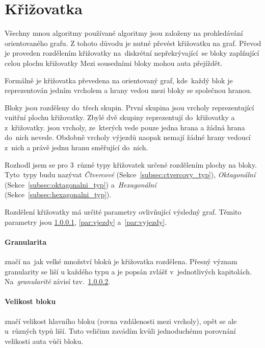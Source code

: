 \section{Křižovatka}\label{sec:krizovatka}

%


Všechny mnou algoritmy používané algoritmy jsou založeny na prohledávání orientovaného grafu.
Z tohoto důvodu je nutné převést křižovatku na graf.
Převod je proveden rozdělením křižovatky na~diskrétní nepřekrývající~se bloky zaplňující celou plochu křižovatky
Mezi sousedními bloky mohou auta přejíždět.

Formálně je křižovatka převedena na orientovaný graf,
kde~každý blok je reprezentován jedním vrcholem a hrany vedou mezi bloky se společnou hranou.

Bloky jsou rozděleny do~třech skupin.
První skupina jsou vrcholy reprezentující vnitřní plochu křižovatky.
Zbylé dvě skupiny reprezentují  do~křižovatky a  z~křižovatky.
 jsou vrcholy, ze~kterých vede pouze jedna hrana a žádná hrana do~nich nevede.
Obdobně vrcholy výjezdů naopak nemají žádné hrany vedoucí z~nich a právě jednu hranu směřující do~nich.

Rozhodl jsem se pro $3$~různé typy křižovatek určené rozdělením plochy na bloky.
Tyto~typy budu nazývat \emph{Čtvercové} (Sekce~\ref{subsec:ctvercovy_typ}), \emph{Oktagonální} (Sekce~\ref{subsec:oktagonalni_typ})
a~\emph{Hexagonální} (Sekce~\ref{subsec:hexagonalni_typ}).

Rozdělení křižovatky má určité parametry ovlivňující výsledný graf.
Těmito parametry jsou \ref{par:granularita}, \ref{par:vjezdy} a~\ref{par:vyjezdy}.

\paragraph{Granularita}\label{par:granularita} značí na~jak velké množství bloků je křižovatka rozdělena.
Přesný význam granularity se liší u každého typu a je popsán zvlášť v~jednotlivých kapitolách.
Na~\emph{granularitě} závisí tzv.~\ref{par:velikost_bloku}.  %

\paragraph{Velikost bloku}\label{par:velikost_bloku} značí velikost hlavního bloku (rovna vzdálenosti mezi vrcholy), opět se ale u~různých typů liší.
Tuto veličinu zavádím kvůli jednoduchému porovnání velikosti auta vůči bloku.

